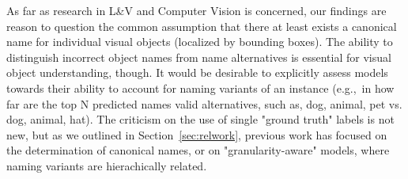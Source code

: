 As far as research in L\&V and Computer Vision is concerned, our findings are reason to question 
 the common assumption that there at least exists a canonical name
 for individual visual objects (localized by bounding boxes).
%
The ability to distinguish incorrect object names from name alternatives is essential for visual object understanding, though. 
It would be desirable to explicitly assess models towards their ability to account for naming variants of an instance (e.g.,~in how far are the top N predicted names valid alternatives, such as, dog, animal, pet vs. dog, animal, hat). 
%
The criticism on the use of single "ground truth" labels is not new, but %
as we outlined in Section\ \ref{sec:relwork}, previous work has focused on the determination of canonical names, or on "granularity-aware" models, where naming variants are hierachically related. 
%
